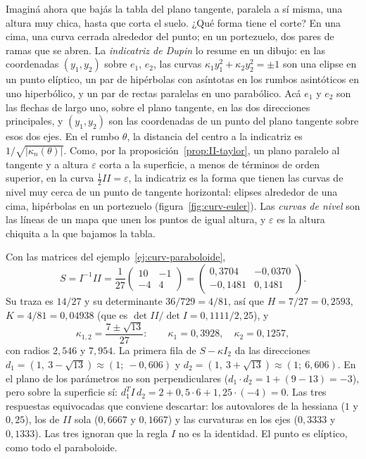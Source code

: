 Imaginá ahora que bajás la tabla del plano tangente, paralela a sí misma, una altura muy chica,
hasta que corta el suelo. ¿Qué forma tiene el corte? En una cima, una curva cerrada alrededor
del punto; en un portezuelo, dos pares de ramas que se abren.
La \emph{indicatriz de Dupin} lo resume en un dibujo: en las coordenadas \((y_1,y_2)\) sobre
\(e_1\), \(e_2\), las curvas \(\kappa_1y_1^2+\kappa_2y_2^2=\pm1\) son una elipse en un punto
elíptico, un par de hipérbolas con asíntotas en los rumbos asintóticos en uno hiperbólico, y
un par de rectas paralelas en uno parabólico. Acá \(e_1\) y \(e_2\) son las flechas de largo
uno, sobre el plano tangente, en las dos direcciones principales, y \((y_1,y_2)\) son las
coordenadas de un punto del plano tangente sobre esos dos ejes. En el rumbo \(\theta\), la distancia del centro a
la indicatriz es \(1/\sqrt{\lvert\kappa_n(\theta)\rvert}\). Como, por la
proposición~\ref{prop:II-taylor}, un plano paralelo al tangente y a altura \(\varepsilon\)
corta a la superficie, a menos de términos de orden superior, en la curva \(\tfrac12II=\varepsilon\), la indicatriz es la forma que
tienen las curvas de nivel muy cerca de un punto de tangente horizontal: elipses alrededor de
una cima, hipérbolas en un portezuelo (figura~\ref{fig:curv-euler}). Las \emph{curvas de nivel}
son las líneas de un mapa que unen los puntos de igual altura, y \(\varepsilon\) es la altura
chiquita a la que bajamos la tabla.

\begin{ejemplo}\label{ej:curv-paraboloide-principales}
Con las matrices del ejemplo~\ref{ej:curv-paraboloide},
\[
  S=I^{-1}II=\frac1{27}\begin{pmatrix}10&-1\\-4&4\end{pmatrix}
  =\begin{pmatrix}0{,}3704&-0{,}0370\\-0{,}1481&0{,}1481\end{pmatrix}.
\]
Su traza es \(14/27\) y su determinante \(36/729=4/81\), así que \(H=7/27=0{,}2593\),
\(K=4/81=0{,}04938\) (que es \(\det II/\det I=0{,}1111/2{,}25\)), y
\[
  \kappa_{1,2}=\frac{7\pm\sqrt{13}}{27}:\qquad \kappa_1=0{,}3928,\quad \kappa_2=0{,}1257,
\]
con radios \(2{,}546\) y \(7{,}954\). La primera fila de \(S-\kappa I_2\) da las direcciones
\(d_1=(1,\ 3-\sqrt{13})\approx(1;\ -0{,}606)\) y \(d_2=(1,\ 3+\sqrt{13})\approx(1;\ 6{,}606)\).
En el plano de los parámetros no son perpendiculares (\(d_1\cdot d_2=1+(9-13)=-3\)), pero
sobre la superficie sí: \(d_1^TI\,d_2=2+0{,}5\cdot6+1{,}25\cdot(-4)=0\). Las tres
respuestas equivocadas que conviene descartar: los autovalores de la hessiana (\(1\) y
\(0{,}25\)), los de \(II\) sola (\(0{,}6667\) y \(0{,}1667\)) y las curvaturas en los ejes
(\(0{,}3333\) y \(0{,}1333\)). Las tres ignoran que la regla \(I\) no es la identidad. El
punto es elíptico, como todo el paraboloide.
\end{ejemplo}

